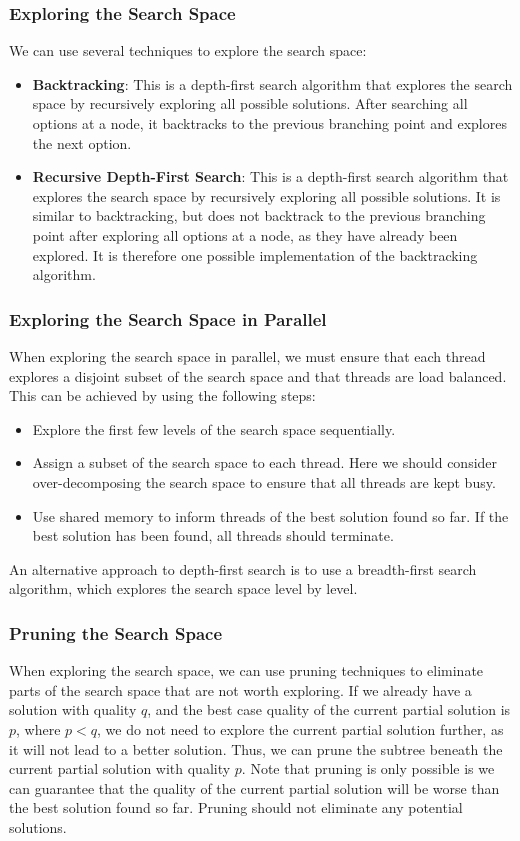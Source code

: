 \documentclass{article}
\begin{document}
\subsubsection{Exploring the Search Space}
We can use several techniques to explore the search space:
\begin{itemize}
    \item \textbf{Backtracking}: This is a depth-first search algorithm
          that explores the search space by recursively exploring all
          possible solutions. After searching all options at a node, it
          backtracks to the previous branching point and explores the
          next option.
    \item \textbf{Recursive Depth-First Search}: This is a depth-first
          search algorithm that explores the search space by recursively
          exploring all possible solutions. It is similar to backtracking,
          but does not backtrack to the previous branching point after
          exploring all options at a node, as they have already been
          explored. It is therefore one possible implementation of
          the backtracking algorithm.
\end{itemize}
\subsubsection{Exploring the Search Space in Parallel}
When exploring the search space in parallel, we must ensure that each
thread explores a disjoint subset of the search space and that threads
are load balanced. This can be achieved by using the following
steps:
\begin{itemize}
    \item Explore the first few levels of the search space sequentially.
    \item Assign a subset of the search space to each thread. Here we
          should consider over-decomposing the search space to ensure
          that all threads are kept busy.
    \item Use shared memory to inform threads of the best solution found
          so far. If the best solution has been found, all threads
          should terminate.
\end{itemize}
An alternative approach to depth-first search is to use a breadth-first
search algorithm, which explores the search space level by level.
\subsubsection{Pruning the Search Space}
When exploring the search space, we can use pruning techniques to
eliminate parts of the search space that are not worth exploring. If we
already have a solution with quality \(q\), and the best case quality of
the current partial solution is \(p\), where \(p < q\), we do not need
to explore the current partial solution further, as it will not lead to
a better solution. Thus, we can prune the subtree beneath the current
partial solution with quality \(p\). Note that pruning is only possible
is we can guarantee that the quality of the current partial solution
will be worse than the best solution found so far. Pruning should not
eliminate any potential solutions.
\end{document}
